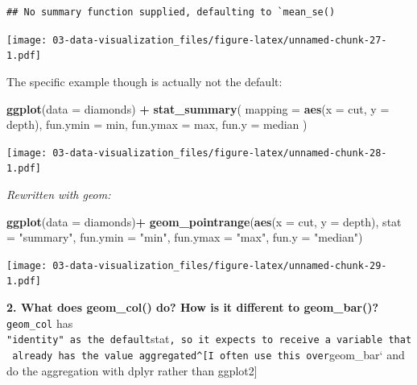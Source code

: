 \documentclass[]{book}
\newenvironment{Shaded}{\begin{snugshade}}{\end{snugshade}}
\newcommand{\DataTypeTok}[1]{\textcolor[rgb]{0.13,0.29,0.53}{#1}}
\newcommand{\KeywordTok}[1]{\textcolor[rgb]{0.13,0.29,0.53}{\textbf{#1}}}
\newcommand{\NormalTok}[1]{#1}
\newcommand{\OperatorTok}[1]{\textcolor[rgb]{0.81,0.36,0.00}{\textbf{#1}}}
\newcommand{\StringTok}[1]{\textcolor[rgb]{0.31,0.60,0.02}{#1}}
\theoremstyle{definition}
\theoremstyle{definition}
\theoremstyle{definition}
\theoremstyle{remark}
\begin{document}
\begin{verbatim}
## No summary function supplied, defaulting to `mean_se()
\end{verbatim}

\texttt{[image: 03-data-visualization\_files/figure-latex/unnamed-chunk-27-1.pdf]}

The specific example though is actually not the default:

\begin{Shaded}
\begin{Highlighting}[]
\KeywordTok{ggplot}\NormalTok{(}\DataTypeTok{data =}\NormalTok{ diamonds) }\OperatorTok{+}\StringTok{ }
\StringTok{  }\KeywordTok{stat_summary}\NormalTok{(}
    \DataTypeTok{mapping =} \KeywordTok{aes}\NormalTok{(}\DataTypeTok{x =}\NormalTok{ cut, }\DataTypeTok{y =}\NormalTok{ depth),}
    \DataTypeTok{fun.ymin =}\NormalTok{ min,}
    \DataTypeTok{fun.ymax =}\NormalTok{ max,}
    \DataTypeTok{fun.y =}\NormalTok{ median}
\NormalTok{  )}
\end{Highlighting}
\end{Shaded}

\texttt{[image: 03-data-visualization\_files/figure-latex/unnamed-chunk-28-1.pdf]}

\emph{Rewritten with geom:}

\begin{Shaded}
\begin{Highlighting}[]
\KeywordTok{ggplot}\NormalTok{(}\DataTypeTok{data =}\NormalTok{ diamonds)}\OperatorTok{+}
\StringTok{  }\KeywordTok{geom_pointrange}\NormalTok{(}\KeywordTok{aes}\NormalTok{(}\DataTypeTok{x =}\NormalTok{ cut, }\DataTypeTok{y =}\NormalTok{ depth), }
                  \DataTypeTok{stat =} \StringTok{"summary"}\NormalTok{, }
                  \DataTypeTok{fun.ymin =} \StringTok{"min"}\NormalTok{,}
                  \DataTypeTok{fun.ymax =} \StringTok{"max"}\NormalTok{, }
                  \DataTypeTok{fun.y =} \StringTok{"median"}\NormalTok{)}
\end{Highlighting}
\end{Shaded}

\texttt{[image: 03-data-visualization\_files/figure-latex/unnamed-chunk-29-1.pdf]}

\textbf{2. What does geom\_col() do? How is it different to
geom\_bar()?}\\
\texttt{geom\_col} has
\texttt{"identity"\ as\ the\ default}stat\texttt{,\ so\ it\ expects\ to\ receive\ a\ variable\ that\ already\ has\ the\ value\ aggregated\^{}{[}I\ often\ use\ this\ over}geom\_bar`
and do the aggregation with dplyr rather than ggplot2{]}
\end{document}
